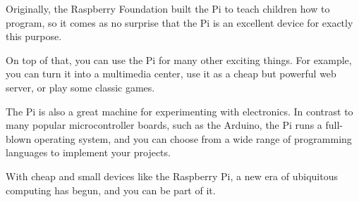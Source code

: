 Originally, the Raspberry Foundation  built the Pi to teach children how to
program, so it comes as no surprise that the Pi is an excellent device for
exactly this purpose. 
\newline

On top of that, you can use the Pi for many other
exciting things. For example, you can turn it into a multimedia center, use it as a cheap but powerful web server, or play some classic games.
\newline

The Pi is also a great machine for experimenting with electronics. In contrast
to many popular microcontroller boards, such as the Arduino, the Pi runs a
full-blown operating system, and you can choose from a wide range of programming
languages to implement your projects.
\newline

With cheap and small devices like the Raspberry Pi, a new era of ubiquitous
computing has begun, and you can be part of it.
